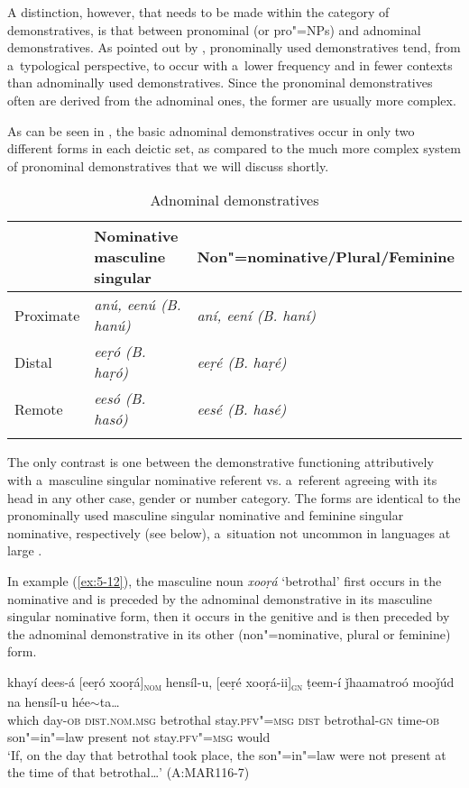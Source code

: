 A distinction, however, that needs to be made within the category of demonstratives, is that between pronominal (or pro"=NPs) and adnominal demonstratives. As pointed out by \citet[206]{himmelmann1996}, pronominally used demonstratives tend, from a~typological perspective, to occur with a~lower frequency and in fewer contexts than adnominally used demonstratives. Since the pronominal demonstratives often are derived from the adnominal ones, the former are usually more complex. 



As can be seen in , the basic adnominal demonstratives occur in only two different forms in each deictic set, as compared to the much more complex system of pronominal demonstratives that we will discuss shortly. 



\begin{table}[ht]
\caption{Adnominal demonstratives}
\begin{tabularx}{\textwidth}{ l@{\hspace{30pt}} Q Q }
\lsptoprule
&
Nominative masculine singular &
Non"=nominative/{\allowbreak}Plural/{\allowbreak}Feminine\\\hline
Proximate &
\textit{anú, eenú (B. hanú)} &
\textit{aní, eení (B. haní)}\\
Distal &
\textit{eeṛó (B. haṛó)} &
\textit{eeṛé (B. haṛé)}\\
Remote &
\textit{eesó (B. hasó)} &
\textit{eesé (B. hasé)}\\\lspbottomrule
\end{tabularx}
\label{tab:5-3}
\end{table}

The only contrast is one between the demonstrative functioning attributively with a~masculine singular nominative referent vs. a~referent agreeing with its head in any other case, gender or number category. The forms are identical to the pronominally used masculine singular nominative and feminine singular nominative, respectively (see below), a~situation not uncommon in languages at large \citep[214]{himmelmann1996}. 


In example (\ref{ex:5-12}), the masculine noun \textit{xooṛá} `betrothal' first occurs in the nominative and is preceded by the adnominal demonstrative in its masculine singular nominative form, then it occurs in the genitive and is then preceded by the adnominal demonstrative in its other (non"=nominative, plural or feminine) form.


\begin{exe}
\ex
\label{ex:5-12}
\gll khayí dees-á [eeṛó xooṛá]\textsc{\textsubscript{nom}} hensíl-u, [eeṛé
 xooṛá-ii]\textsc{\textsubscript{gn}} ṭeem-í ǰhaamatroó mooǰúd na hensíl-u
hée$\sim$ta{\dots} \\
which day-\textsc{ob} \textsc{dist.nom.msg} betrothal stay.\textsc{pfv"=msg}
\textsc{dist} betrothal-\textsc{gn} time-\textsc{ob} son"=in"=law present not stay.\textsc{pfv"=msg} would\\
\glt `If, on the day that betrothal took place, the son"=in"=law were not present at the time of that betrothal{\ldots}' (A:MAR116-7)
\end{exe}

